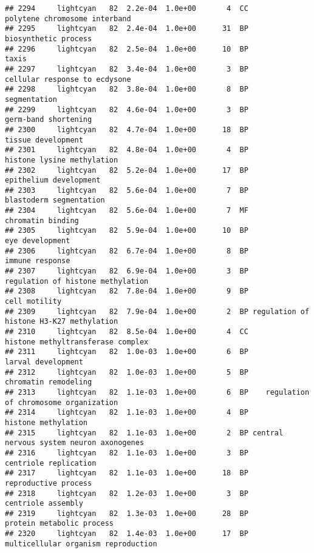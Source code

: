 \documentclass[]{article}
\begin{document}
\begin{verbatim}
## 2294     lightcyan   82  2.2e-04  1.0e+00       4  CC            polytene chromosome interband
## 2295     lightcyan   82  2.4e-04  1.0e+00      31  BP                     biosynthetic process
## 2296     lightcyan   82  2.5e-04  1.0e+00      10  BP                                    taxis
## 2297     lightcyan   82  3.4e-04  1.0e+00       3  BP            cellular response to ecdysone
## 2298     lightcyan   82  3.8e-04  1.0e+00       8  BP                             segmentation
## 2299     lightcyan   82  4.6e-04  1.0e+00       3  BP                     germ-band shortening
## 2300     lightcyan   82  4.7e-04  1.0e+00      18  BP                       tissue development
## 2301     lightcyan   82  4.8e-04  1.0e+00       4  BP               histone lysine methylation
## 2302     lightcyan   82  5.2e-04  1.0e+00      17  BP                   epithelium development
## 2303     lightcyan   82  5.6e-04  1.0e+00       7  BP                  blastoderm segmentation
## 2304     lightcyan   82  5.6e-04  1.0e+00       7  MF                        chromatin binding
## 2305     lightcyan   82  5.9e-04  1.0e+00      10  BP                          eye development
## 2306     lightcyan   82  6.7e-04  1.0e+00       8  BP                          immune response
## 2307     lightcyan   82  6.9e-04  1.0e+00       3  BP        regulation of histone methylation
## 2308     lightcyan   82  7.8e-04  1.0e+00       9  BP                            cell motility
## 2309     lightcyan   82  7.9e-04  1.0e+00       2  BP regulation of histone H3-K27 methylation
## 2310     lightcyan   82  8.5e-04  1.0e+00       4  CC        histone methyltransferase complex
## 2311     lightcyan   82  1.0e-03  1.0e+00       6  BP                       larval development
## 2312     lightcyan   82  1.0e-03  1.0e+00       5  BP                     chromatin remodeling
## 2313     lightcyan   82  1.1e-03  1.0e+00       6  BP    regulation of chromosome organization
## 2314     lightcyan   82  1.1e-03  1.0e+00       4  BP                      histone methylation
## 2315     lightcyan   82  1.1e-03  1.0e+00       2  BP central nervous system neuron axonogenes
## 2316     lightcyan   82  1.1e-03  1.0e+00       3  BP                    centriole replication
## 2317     lightcyan   82  1.1e-03  1.0e+00      18  BP                     reproductive process
## 2318     lightcyan   82  1.2e-03  1.0e+00       3  BP                       centriole assembly
## 2319     lightcyan   82  1.3e-03  1.0e+00      28  BP                protein metabolic process
## 2320     lightcyan   82  1.4e-03  1.0e+00      17  BP      multicellular organism reproduction

\end{verbatim}
\end{document}
